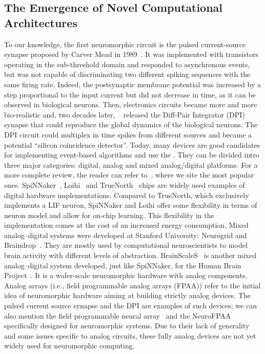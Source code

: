 \documentclass[brainsci, %
               review,accept,pdftex,moreauthors
               ]{Definitions/mdpi}
\begin{document}
\subsection{The Emergence of Novel Computational Architectures}
%
To our knowledge, the first neuromorphic circuit is the pulsed current-source synapse proposed by Carver Mead in 1989~\citep{mead_analog_1989}. It was implemented with transistors operating in the sub-threshold domain and responded to asynchronous events, but was not capable of discriminating two different spiking sequences with the same firing rate. Indeed, the postsynaptic membrane potential was increased by a step proportional to the input current but did not decrease in time, as it can be observed in biological neurons. Then, electronics circuits became more and more bio-realistic and, two decades later, ~\citep{bartolozzi_synaptic_2007} released the Diff-Pair Integrator (DPI) synapse that could reproduce the global dynamics of the biological neurons. The DPI circuit could multiplex in time spikes from different sources and became a potential  ``silicon coincidence detector''. Today, many devices are good candidates for implementing event-based algorithms and use the . They can be divided intro three major categories: digital, analog and mixed analog/digital platforms. For a more complete review, the reader can refer to~\citep{schuman_survey_2017}, where we site the most popular ones. SpiNNaker~\citep{furber_overview_2013, furber_spinnaker_2020}, Loihi~\citep{davies_loihi_2018} and TrueNorth~\citep{merolla_million_2014} chips are widely used examples of digital hardware implementations. Compared to TrueNorth, which exclusively implements a LIF neuron, SpiNNaker and Loihi offer some flexibility in terms of neuron model and allow for on-chip learning. This flexibility in the implementation comes at the cost of an increased energy consumption. Mixed analog--digital systems were developed at Stanford University: Neurogrid and Braindrop~\citep{benjamin_neurogrid_2014, neckar_braindrop_2019}. They are mostly used by computational neuroscientists to model brain activity with different levels of abstraction. BrainScaleS~\citep{schemmel_wafer-scale_2010} is another mixed analog--digital system developed, just like SpiNNaker, for the Human Brain Project~\citep{markram_introducing_2011}. It is a wafer-scale neuromorphic hardware with analog components. Analog arrays (i.e., field programmable analog arrays (FPAA)) refer to the initial idea of neuromorphic hardware aiming at building strictly analog devices. The pulsed current source synapse and the DPI are examples of such devices; we can also mention the field programmable neural array~\citep{farquhar_field_2006} and the NeuroFPAA~\citep{cheng_fpaa_2009} specifically designed for neuromorphic systems. Due to their lack of generality and some issues specific to analog circuits, these fully analog devices are not yet widely used for neuromorphic computing. 
%
\end{document}
